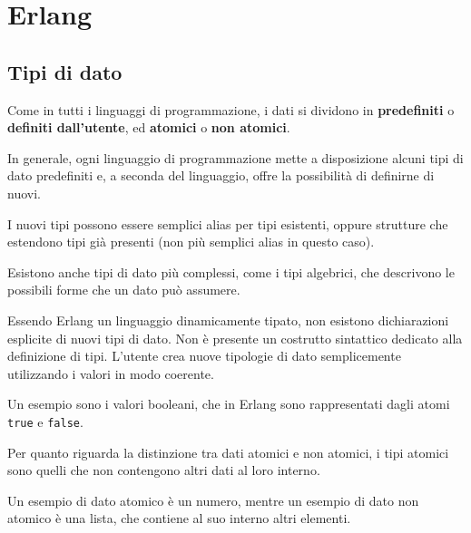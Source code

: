 \documentclass{article}
\begin{document}
\pagestyle{empty}

\section*{Erlang}
\large

\subsection*{Tipi di dato}
Come in tutti i linguaggi di programmazione, i dati si dividono in \textbf{predefiniti} o \textbf{definiti dall'utente}, ed \textbf{atomici} o \textbf{non atomici}.

In generale, ogni linguaggio di programmazione mette a disposizione alcuni tipi di dato predefiniti e, a seconda del linguaggio, offre la possibilità di definirne di nuovi.

I nuovi tipi possono essere semplici alias per tipi esistenti, oppure strutture che estendono tipi già presenti (non più semplici alias in questo caso).

Esistono anche tipi di dato più complessi, come i tipi algebrici, che descrivono le possibili forme che un dato può assumere.

Essendo Erlang un linguaggio dinamicamente tipato, non esistono dichiarazioni esplicite di nuovi tipi di dato. Non è presente un costrutto sintattico dedicato alla definizione di tipi. L'utente crea nuove tipologie di dato semplicemente utilizzando i valori in modo coerente.

Un esempio sono i valori booleani, che in Erlang sono rappresentati dagli atomi \texttt{true} e \texttt{false}.

Per quanto riguarda la distinzione tra dati atomici e non atomici, i tipi atomici sono quelli che non contengono altri dati al loro interno.

Un esempio di dato atomico è un numero, mentre un esempio di dato non atomico è una lista, che contiene al suo interno altri elementi.
\end{document}
